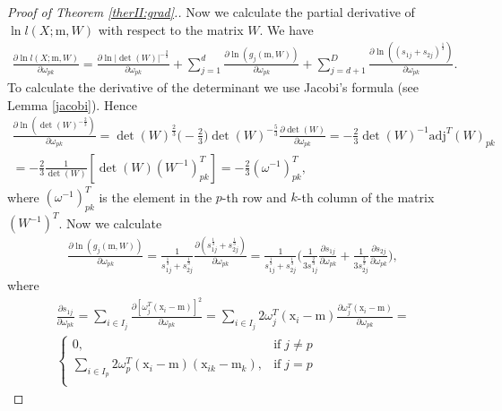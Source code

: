 \documentclass[12pt]{article}
\def\w{\omega}
\def\v{\mathrm{V}}
\def\x{\mathrm{x}}
\def\m{\mathrm{m}}
\theoremstyle{definition}
\begin{document}
\begin{proof}[Proof of Theorem \ref{therII:grad}.]
Now we calculate the partial derivative of $\ln {l}(X;\m,W)$ with respect to the matrix $W$. We have
$$
\begin{array}{l}
\frac{\partial \ln {l}(X;\m,W)}{\partial \w_{pk}} = \frac{\partial \ln |\det(W)|^{-\frac{2}{3}}}{\partial \w_{pk}} + \sum\limits_{j=1}^d \frac{\partial \ln ({g}_j(\m,W))}{\partial \w_{pk}} + \sum\limits_{j=d+1}^D \frac{\partial \ln ( (s_{1j}+s_{2j})^{\frac{1}{3}} )}{\partial \w_{pk}}.
\end{array}
$$
To calculate the derivative of the determinant we use Jacobi's formula (see Lemma \ref{jacobi}).
Hence%
$$
\begin{array}{l}
\frac{\partial \ln (\det(W)^{-\frac{2}{3}})}{\partial \w_{pk}} = \det(W)^{\frac{2}{3}}  \Big(-\frac{2}{3}\Big)  \det(W)^{-\frac{5}{3}}  \frac{\partial \det(W)}{\partial \w_{pk}} = -\frac{2}{3} \det(W)^{-1}  \mathrm{adj}^T(W)_{pk} \\[6pt]
 = -\frac{2}{3} \frac{1}{\det(W)}  \left[\det(W)  (W^{-1})^T_{pk}\right]= -\frac{2}{3}  (\w^{-1})^T_{pk},
\end{array}
$$
where $(\w^{-1})^T_{pk}$ is the element in the $p$-th row and $k$-th column of the matrix $(W^{-1})^T$. Now we calculate %
$$
\begin{array}{l}
\frac{\partial \ln ({g}_j(\m,W))}{\partial \w_{pk}} = \frac{1}{{s}_{1j}^{\frac{1}{3}} + {s}_{2j}^{\frac{1}{3}}} \frac{\partial ({s}_{1j}^{\frac{1}{3}} + {s}_{2j}^{\frac{1}{3}})}{\partial \w_{pk}}= \frac{1}{{s}_{1j}^{\frac{1}{3}} + {s}_{2j}^{\frac{1}{3}}} \bigg(
\frac{1}{3 {s}_{1j}^{\frac{2}{3}}}  \frac{\partial {s}_{1j}}{\partial \w_{pk}} +
\frac{1}{3 {s}_{2j}^{\frac{2}{3}}}  \frac{\partial {s}_{2j}}{\partial \w_{pk}}
\bigg),
\end{array}
$$
where
$$
\begin{array}{l}
\frac{\partial {s}_{1j}}{\partial \w_{pk}} = \sum\limits_{ i \in {I}_j} \frac{\partial [\w^T_j (\x_i - \m)]^2}{\partial \w_{pk}} = \sum\limits_{ i \in {I}_j} 2 \w^T_j (\x_i - \m) \frac{\partial \w^T_j (\x_i - \m)}{\partial \w_{pk}}=
\\[6pt]
\left\{ \begin{array}{ll}
0, & \text{if} \; j\neq p\\
\sum\limits_{ i \in {I}_p} 2 \w^T_p (\x_i - \m) (\x_{ik} - \m_k), & \text{if} \; j=p\\
\end{array} \right.

\end{array}$$
\end{proof}
\end{document}
